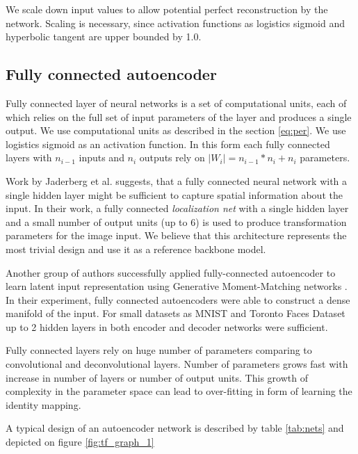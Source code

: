 We scale down input values to allow potential perfect reconstruction by the network.
Scaling is necessary, since activation functions as logistics sigmoid and hyperbolic tangent are upper bounded by 1.0.


\subsection{Fully connected autoencoder}

Fully connected layer of neural networks is a set of computational units, each of which relies on the full set of input parameters of the layer and produces a single output.
We use computational units as described in the section \ref{eq:per}.
We use logistics sigmoid as an activation function.
In this form each fully connected layers with $n_{i-1}$ inputs and $n_i$ outputs rely on $|W_i|=n_{i-1}*n_i+n_i$ parameters.

Work by Jaderberg et al. \cite{Jaderberg2015} suggests, that a fully connected neural network with a single hidden layer might be sufficient to capture spatial information about the input.
In their work, a fully connected \textit{localization net} with a single hidden layer and a small number of output units (up to 6) is used to produce transformation parameters for the image input.
We believe that this architecture represents the most trivial design and use it as a reference backbone model.

Another group of authors successfully applied fully-connected autoencoder to learn latent input representation using Generative Moment-Matching networks \cite{Li2015}.
In their experiment, fully connected autoencoders were able to construct a dense manifold of the input.
For small datasets as MNIST and Toronto Faces Dataset \cite{tfd,lecun-mnisthandwrittendigit-2010} up to 2 hidden layers in both encoder and decoder networks were sufficient.

Fully connected layers rely on huge number of parameters comparing to convolutional and deconvolutional layers.
Number of parameters grows fast with increase in number of layers or number of output units.
This growth of complexity in the parameter space can lead to over-fitting in form of learning the identity mapping.

A typical design of an autoencoder network is described by table \ref{tab:nets} and depicted on figure \ref{fig:tf_graph_1}


